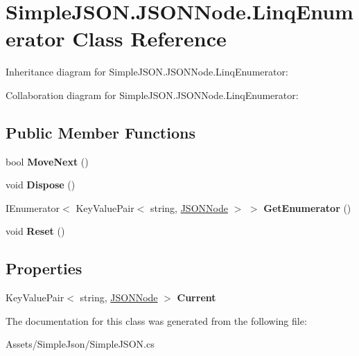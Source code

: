 \hypertarget{classSimpleJSON_1_1JSONNode_1_1LinqEnumerator}{}\section{Simple\+J\+S\+O\+N.\+J\+S\+O\+N\+Node.\+Linq\+Enumerator Class Reference}
\label{classSimpleJSON_1_1JSONNode_1_1LinqEnumerator}


Inheritance diagram for Simple\+J\+S\+O\+N.\+J\+S\+O\+N\+Node.\+Linq\+Enumerator\+:


Collaboration diagram for Simple\+J\+S\+O\+N.\+J\+S\+O\+N\+Node.\+Linq\+Enumerator\+:
\subsection*{Public Member Functions}
\begin{DoxyCompactItemize}
\item 
bool {\bfseries Move\+Next} ()\hypertarget{classSimpleJSON_1_1JSONNode_1_1LinqEnumerator_a68cfb2bff1ed159652b13e09fe97319b}{}\label{classSimpleJSON_1_1JSONNode_1_1LinqEnumerator_a68cfb2bff1ed159652b13e09fe97319b}

\item 
void {\bfseries Dispose} ()\hypertarget{classSimpleJSON_1_1JSONNode_1_1LinqEnumerator_a0f345bf9b7af5bf686b2453034780a62}{}\label{classSimpleJSON_1_1JSONNode_1_1LinqEnumerator_a0f345bf9b7af5bf686b2453034780a62}

\item 
I\+Enumerator$<$ Key\+Value\+Pair$<$ string, \hyperlink{classSimpleJSON_1_1JSONNode}{J\+S\+O\+N\+Node} $>$ $>$ {\bfseries Get\+Enumerator} ()\hypertarget{classSimpleJSON_1_1JSONNode_1_1LinqEnumerator_ac1d81439c8599a4978cb79c140a0e405}{}\label{classSimpleJSON_1_1JSONNode_1_1LinqEnumerator_ac1d81439c8599a4978cb79c140a0e405}

\item 
void {\bfseries Reset} ()\hypertarget{classSimpleJSON_1_1JSONNode_1_1LinqEnumerator_a4002a7e067a082b0459c0b144fcf65f1}{}\label{classSimpleJSON_1_1JSONNode_1_1LinqEnumerator_a4002a7e067a082b0459c0b144fcf65f1}

\end{DoxyCompactItemize}
\subsection*{Properties}
\begin{DoxyCompactItemize}
\item 
Key\+Value\+Pair$<$ string, \hyperlink{classSimpleJSON_1_1JSONNode}{J\+S\+O\+N\+Node} $>$ {\bfseries Current}\hypertarget{classSimpleJSON_1_1JSONNode_1_1LinqEnumerator_ab78b413b41e2063b892bcfbe3a76cc9f}{}\label{classSimpleJSON_1_1JSONNode_1_1LinqEnumerator_ab78b413b41e2063b892bcfbe3a76cc9f}

\end{DoxyCompactItemize}


The documentation for this class was generated from the following file\+:\begin{DoxyCompactItemize}
\item 
Assets/\+Simple\+Json/Simple\+J\+S\+O\+N.\+cs\end{DoxyCompactItemize}
